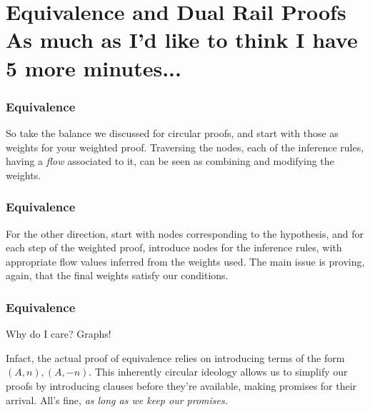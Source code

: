 \documentclass[aspectratio=169]{beamer}
\newcounter{notes}
\begin{document}
    \section{Equivalence and Dual Rail Proofs\\
    {\tiny As much as I'd like to think I have 5 more minutes...}}
    \begin{frame}
        \frametitle{Equivalence}


        So take the balance we discussed for circular proofs, and start with
        those as weights for your weighted proof.  Traversing the
        nodes, each of the inference rules, having a \emph{flow} associated to
        it, can be seen as combining and modifying the weights.
        \cite{bonet2020equivalence}  
    \end{frame}
    \begin{frame}
        \frametitle{Equivalence}
        \pause

        For the other direction, start with nodes corresponding to the
        hypothesis, and for each step of the weighted proof, introduce nodes for
        the inference rules, with appropriate flow values inferred from the
        weights used. The main issue is proving, again, that the final weights
        satisfy our conditions.
    \end{frame}
    \begin{frame}
        \frametitle{Equivalence}
         Why do I care?
        \pause Graphs!

        \pause Infact, the actual proof of equivalence relies on introducing
        terms of the form $(A, n), (A, -n)$. \pause This inherently circular ideology
        allows us to simplify our proofs by introducing clauses before they're
        available, making promises for their arrival. \pause All's fine, \emph{as long
        as we keep our promises.}
    \end{frame}
\end{document}
